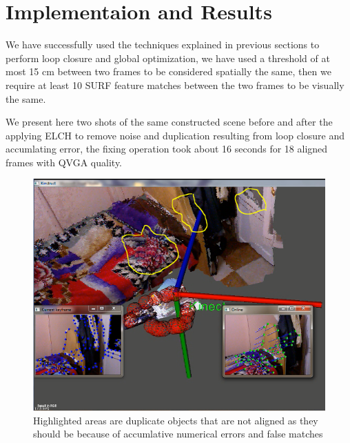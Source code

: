 \pagebreak
\section{Implementaion and Results}

We have successfully used the techniques explained in previous sections to perform loop closure and global optimization, we have used a threshold of at most 15 cm between two frames to be considered spatially the same, then we require at least 10 SURF feature matches between the two frames to be visually the same.

We present here two shots of the same constructed scene before and after the applying ELCH to remove noise and duplication resulting from loop closure and accumlating error, the fixing operation took about 16 seconds for 18 aligned frames with QVGA quality.

\begin{figure}[H]
\centering
\includegraphics{Loop/last_frame_loop_highlighted.png}
\caption{Highlighted areas are duplicate objects that are not aligned as they should be because of accumlative numerical errors and false matches}
\label{fig:before_fixing}
\end{figure}

